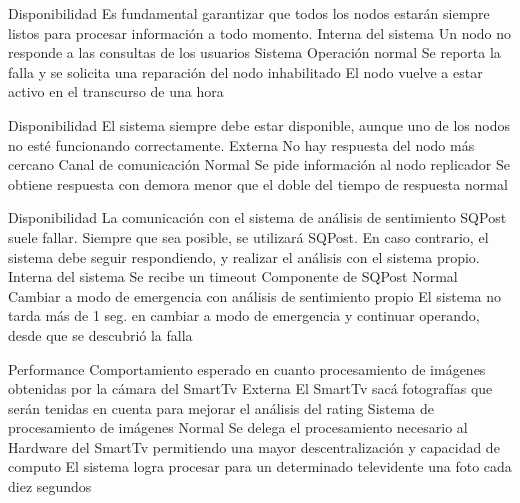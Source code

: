   \begin{enumerate}


\QA
  {Disponibilidad} %
  {Es fundamental garantizar que todos los nodos estarán siempre listos para procesar información a todo momento.} %
  {Interna del sistema} %
  {Un nodo no responde a las consultas de los usuarios} %
  {Sistema} %
  {Operación normal} %
  {Se reporta la falla y se solicita una reparación del nodo inhabilitado} %
  {El nodo vuelve a estar activo en el transcurso de una hora} %

\QA
  {Disponibilidad} %
  {El sistema siempre debe estar disponible, aunque uno de los nodos no esté funcionando correctamente.} %
  {Externa} %
  {No hay respuesta del nodo más cercano} %
  {Canal de comunicación} %
  {Normal} %
  {Se pide información al nodo replicador} %
  {Se obtiene respuesta con demora menor que el doble del tiempo de respuesta normal} %

\QA
  {Disponibilidad} %
  {La comunicación con el sistema de análisis de sentimiento SQPost suele fallar. Siempre que sea posible, se utilizará SQPost. En caso contrario, el sistema debe seguir respondiendo, y realizar el análisis con el sistema propio.} %
  {Interna del sistema} %
  {Se recibe un timeout} %
  {Componente de SQPost} %
  {Normal} %
  {Cambiar a modo de emergencia con análisis de sentimiento propio} %
  {El sistema no tarda más de 1 seg. en cambiar a modo de emergencia y continuar operando, desde que se descubrió la falla} %



\QA
  {Performance} %
  {Comportamiento esperado en cuanto procesamiento de imágenes obtenidas por la cámara del SmartTv} %
  {Externa} %
  {El SmartTv sacá fotografías que serán tenidas en cuenta para mejorar el análisis del rating} %
  {Sistema de procesamiento de imágenes} %
  {Normal} %
  {Se delega el procesamiento necesario al Hardware del SmartTv permitiendo una mayor descentralización y capacidad de computo} %
  {El sistema logra procesar para un determinado televidente una foto cada diez segundos} %


\end{enumerate}
